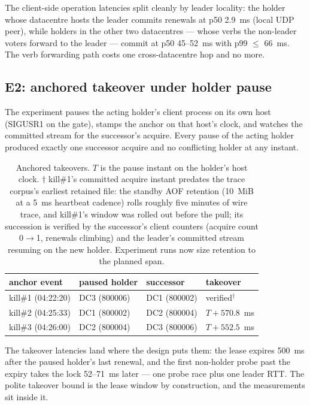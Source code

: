 The client-side operation latencies split cleanly by leader locality:
the holder whose datacentre hosts the leader commits renewals at
p50 2.9~ms (local UDP peer), while holders in the other two
datacentres --- whose verbs the non-leader voters forward to the
leader --- commit at p50 45--52~ms with p99 $\le$ 66~ms. The verb
forwarding path costs one cross-datacentre hop and no more.

\subsection{E2: anchored takeover under holder pause}

The experiment pauses the acting holder's client process on its own
host (SIGUSR1 on the gate), stamps the anchor on that host's clock,
and watches the committed stream for the successor's acquire. Every
pause of the acting holder produced exactly one successor acquire and
no conflicting holder at any instant.

\begin{table}[t]
\centering
\small
\begin{tabular}{llll}
\toprule
anchor event & paused holder & successor & takeover \\
\midrule
kill\#1 (04:22:20) & DC3 (800006) & DC1 (800002) & verified$^{\dagger}$ \\
kill\#2 (04:25:33) & DC1 (800002) & DC2 (800004) & $T+570.8$~ms \\
kill\#3 (04:26:00) & DC2 (800004) & DC3 (800006) & $T+552.5$~ms \\
\bottomrule
\end{tabular}
\caption{Anchored takeovers. $T$ is the pause instant on the holder's
host clock. $\dagger$ kill\#1's committed acquire instant predates the
trace corpus's earliest retained file: the standby AOF retention
(10~MiB at a 5~ms heartbeat cadence) rolls roughly five minutes of
wire trace, and kill\#1's window was rolled out before the pull; its
succession is verified by the successor's client counters (acquire
count 0$\to$1, renewals climbing) and the leader's committed stream
resuming on the new holder. Experiment runs now size retention to the
planned span.}
\label{tab:takeover-elapsed}
\end{table}

The takeover latencies land where the design puts them: the lease
expires 500~ms after the paused holder's last renewal, and the first
non-holder probe past the expiry takes the lock 52--71~ms later ---
one probe race plus one leader RTT. The polite takeover bound is the
lease window by construction, and the measurements sit inside it.

